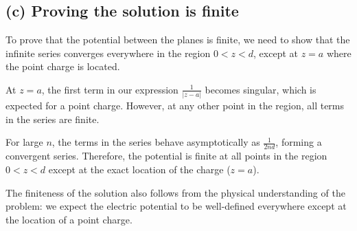 \documentclass{article}
\begin{document}
\subsection*{(c) Proving the solution is finite}

To prove that the potential between the planes is finite, we need to show that the infinite series converges everywhere in the region $0 < z < d$, except at $z = a$ where the point charge is located.

At $z = a$, the first term in our expression $\frac{1}{|z-a|}$ becomes singular, which is expected for a point charge. However, at any other point in the region, all terms in the series are finite.

For large $n$, the terms in the series behave asymptotically as $\frac{1}{2nd}$, forming a convergent series. Therefore, the potential is finite at all points in the region $0 < z < d$ except at the exact location of the charge ($z = a$).

The finiteness of the solution also follows from the physical understanding of the problem: we expect the electric potential to be well-defined everywhere except at the location of a point charge.
\end{document}

